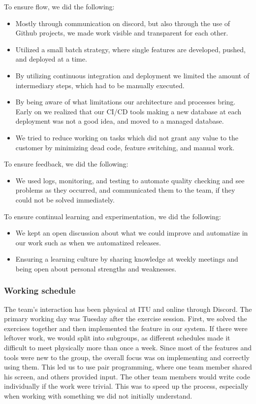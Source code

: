 \noindent To ensure flow, we did the following:
\begin{itemize}
    \item Mostly through communication on discord, but also through the use of Github projects, we made work visible and transparent for each other. %
    \item Utilized a small batch strategy, where single features are developed, pushed, and deployed at a time. %
    \item By utilizing continuous integration and deployment we limited the amount of intermediary steps, which had to be manually executed. %
    \item By being aware of what limitations our architecture and processes bring. Early on we realized that our CI/CD tools making a new database at each deployment was not a good idea, and moved to a managed database. %
    \item We tried to reduce working on tasks which did not grant any value to the customer by minimizing dead code, feature switching, and manual work. %
\end{itemize}

\noindent To ensure feedback, we did the following:
\begin{itemize}
    \item We used logs, monitoring, and testing to automate quality checking and see problems as they occurred, and communicated them to the team, if they could not be solved immediately. %
\end{itemize}

\noindent To ensure continual learning and experimentation, we did the following:
\begin{itemize}
    \item We kept an open discussion about what we could improve and automatize in our work such as when we automatized releases.
    \item Ensuring a learning culture by sharing knowledge at weekly meetings and being open about personal strengths and weaknesses. 
\end{itemize}

\subsubsection{Working schedule}
The team's interaction has been physical at ITU and online through Discord. The primary working day was Tuesday after the exercise session. First, we solved the exercises together and then implemented the feature in our system. If there were leftover work, we would split into subgroups, as different schedules made it difficult to meet physically more than once a week. Since most of the features and tools were new to the group, the overall focus was on implementing and correctly using them. This led us to use pair programming, where one team member shared his screen, and others provided input. The other team members would write code individually if the work were trivial. This was to speed up the process, especially when working with something we did not initially understand.

